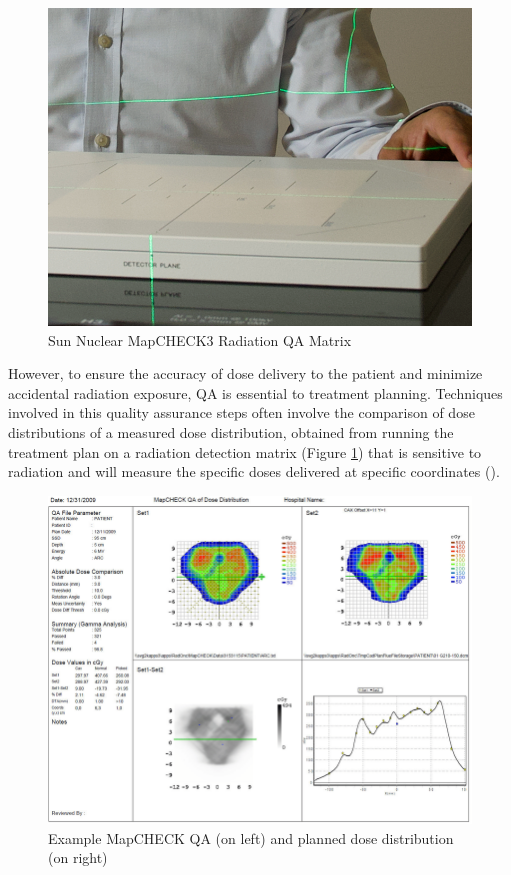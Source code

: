 \documentclass[12pt]{article}
\begin{document}
\begin{figure}[h]
  \centering
  \includegraphics[scale=1.2]{images/map.png}
  \caption{Sun Nuclear MapCHECK3 Radiation QA Matrix}
  \label{fig:mat}
\end{figure}


However, to ensure the accuracy of dose delivery to the patient and minimize accidental radiation exposure, QA is essential to treatment planning. Techniques involved in this quality assurance steps often involve the comparison of dose distributions of a measured dose distribution, obtained from running the treatment plan on a radiation detection matrix (Figure \ref{fig:mat}) that is sensitive to radiation and will measure the specific doses delivered at specific coordinates (\textcite{sunnuclear}).


\begin{figure}[h]
  \centering
  \includegraphics[width=\linewidth]{images/examplemap.png}
  \caption{Example MapCHECK QA (on left) and planned dose distribution (on right)}
  \label{fig:ex}
\end{figure}
\end{document}
